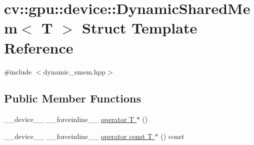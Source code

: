 \hypertarget{structcv_1_1gpu_1_1device_1_1DynamicSharedMem}{\section{cv\-:\-:gpu\-:\-:device\-:\-:Dynamic\-Shared\-Mem$<$ T $>$ Struct Template Reference}
\label{structcv_1_1gpu_1_1device_1_1DynamicSharedMem}
}


{\ttfamily \#include $<$dynamic\-\_\-smem.\-hpp$>$}

\subsection*{Public Member Functions}
\begin{DoxyCompactItemize}
\item 
\-\_\-\-\_\-device\-\_\-\-\_\- \-\_\-\-\_\-forceinline\-\_\-\-\_\- \hyperlink{structcv_1_1gpu_1_1device_1_1DynamicSharedMem_a80b9bd949cfd787fa44ff1878416154f}{operator T $\ast$} ()
\item 
\-\_\-\-\_\-device\-\_\-\-\_\- \-\_\-\-\_\-forceinline\-\_\-\-\_\- \hyperlink{structcv_1_1gpu_1_1device_1_1DynamicSharedMem_a3a1385fa2511701584f88aa87eb5a5e4}{operator const T $\ast$} () const 
\end{DoxyCompactItemize}


